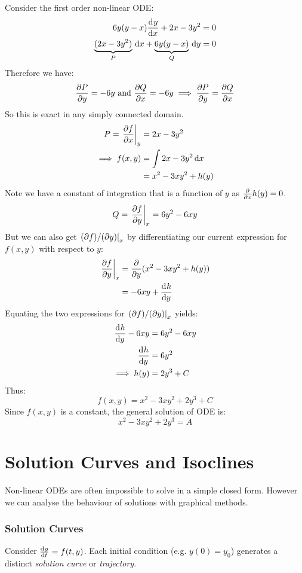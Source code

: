 \documentclass[../main.tex]{subfiles}
\begin{document}
\begin{example}
  Consider the first order non-linear ODE:
  \begin{align*}
    6y(y-x)\deriv{y}{x} + 2x - 3y^2 &= 0 \\
    \underbrace{(2x - 3y^2)}_{P}\d{x} + \underbrace{6y(y - x)}_{Q}\d{y} &= 0
  \end{align*}
  Therefore we have:
  \[
    \pderiv{P}{y} = -6y \text{ and } \pderiv{Q}{x} = -6y \implies \pderiv{P}{y} = \pderiv{Q}{x}
  \]
  So this is exact in any simply connected domain.
  \begin{align*}
    P = \at{\pderiv{f}{x}}{y} &= 2x - 3y^2 \\
    \implies f(x, y) &= \int 2x - 3y^2 \d{x} \\
                     &= x^2 - 3xy^2 + h(y)
  \end{align*}
  Note we have a constant of integration that is a function of $y$ as $\pderiv{}{x}h(y) = 0$.
  \[
    Q = \at{\pderiv{f}{y}}{x} = 6y^2 - 6xy
  \]
  But we can also get $\left. (\partial f)/(\partial y) \right|_{x}$ by differentiating our current expression for $f(x, y)$ with respect to $y$:
  \begin{align*}
    \at{\pderiv{f}{y}}{x} &= \pderiv{}{y}(x^2 - 3xy^2 + h(y)) \\
                          &= -6xy + \deriv{h}{y}\\
  \end{align*}
  Equating the two expressions for $\left. (\partial f)/(\partial y) \right|_{x}$ yields:
  \begin{align*}
    \deriv{h}{y} - 6xy &= 6y^2 - 6xy \\
    \deriv{h}{y} &= 6y^2 \\
    \implies h(y) &= 2y^3 + C
  \end{align*}
  Thus:
  \[
    f(x, y) = x^2 - 3xy^2 + 2y^3 + C
  \]
  Since $f(x, y)$ is a constant, the general solution of ODE is:
  \[
    x^2 - 3xy^2 + 2y^3 = A
  \]
\end{example}
\section{Solution Curves and Isoclines}
Non-linear ODEs are often impossible to solve in a simple closed form.
However we can analyse the behaviour of solutions with graphical methods.
\subsubsection{Solution Curves}
Consider $\deriv{y}{t} = f(t, y)$.
Each initial condition (e.g. $y(0) = y_0$) generates a distinct \textit{solution curve} or \textit{trajectory}.
\end{document}
